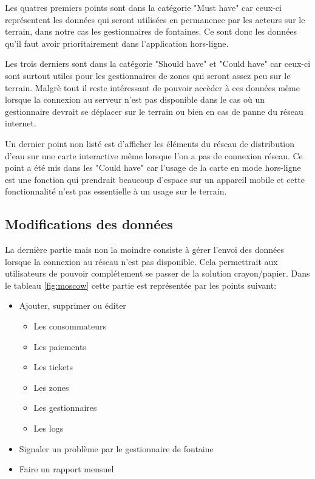 \documentclass{EPL-master-thesis-covers-FR}
\begin{document}
				Les quatres premiers points sont dans la catégorie "Must have" car ceux-ci représentent les données qui seront utilisées en permanence par les acteurs sur le terrain, dans notre cas les gestionnaires de fontaines. Ce sont donc les données qu'il faut avoir prioritairement dans l'application hors-ligne.
				
				Les trois derniers sont dans la catégorie "Should have" et "Could have" car ceux-ci sont surtout utiles pour les gestionnaires de zones qui seront assez peu sur le terrain. Malgrè tout il reste intéressant de pouvoir accèder à ces données même lorsque la connexion au serveur n'est pas disponible dans le cas où un gestionnaire devrait se déplacer sur le terrain ou bien en cas de panne du réseau internet.
				
				Un dernier point non listé est d'afficher les éléments du réseau de distribution d'eau sur une carte interactive même lorsque l'on a pas de connexion réseau. Ce point a été mis dans les "Could have" car l'usage de la carte en mode hors-ligne est une fonction qui prendrait beaucoup d'espace sur un appareil mobile et cette fonctionnalité n'est pas essentielle à un usage sur le terrain.

			\subsection*{Modifications des données}
				\label{sec:gest_donnee}
				La dernière partie mais non la moindre consiste à gérer l'envoi des données lorsque la connexion au réseau n'est pas disponible. Cela permettrait aux utilisateurs de pouvoir complétement se passer de la solution crayon/papier.
				Dans le tableau \ref{fig:moscow} cette partie est représentée par les points suivant:
				\begin{itemize}
					\item Ajouter, supprimer ou éditer
					\begin{itemize}
						\item Les consommateurs
						\item Les paiements
						\item Les tickets
						\item Les zones
						\item Les gestionnaires
						\item Les logs
					\end{itemize}
					\item Signaler un problème par le gestionnaire de fontaine
					\item Faire un rapport mensuel
				\end{itemize}
				
\end{document}
